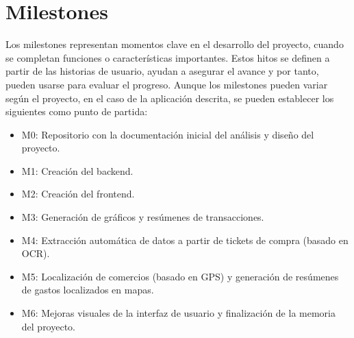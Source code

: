 \begin{itemize}
\end{itemize}

\section{Milestones}\label{sec:milestones}    
Los milestones representan momentos clave en el desarrollo del proyecto, cuando se completan funciones o características importantes. Estos hitos se definen a partir de las historias de usuario, ayudan a asegurar el avance y por tanto, pueden usarse para evaluar el progreso. Aunque los milestones pueden variar según el proyecto, en el caso de la aplicación descrita, se pueden establecer los siguientes como punto de partida:

\begin{itemize}
    \item M0: Repositorio con la documentación inicial del análisis y diseño del proyecto.
    \item M1: Creación del backend.
    \item M2: Creación del frontend.
    \item M3: Generación de gráficos y resúmenes de transacciones.
    \item M4: Extracción automática de datos a partir de tickets de compra (basado en OCR).
    \item M5: Localización de comercios (basado en GPS) y generación de resúmenes de gastos localizados en mapas.
    \item M6: Mejoras visuales de la interfaz de usuario y finalización de la memoria del proyecto.
\end{itemize}